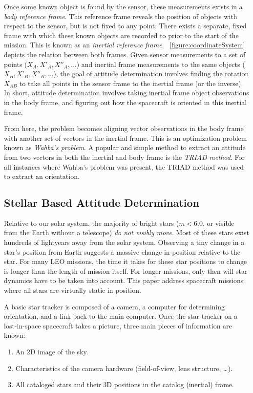 Once some known object is found by the sensor, these measurements exists in a \textit{body reference frame}.
This reference frame reveals the position of objects with respect to the sensor, but is not fixed to any point.
There exists a separate, fixed frame with which these known objects are recorded to prior to the start of the mission.
This is known as an \textit{inertial reference frame}.
~\autoref{figure:coordinateSystem} depicts the relation between both frames.
Given sensor measurements to a set of points ($X_A, X'_A, X''_A, \ldots$) and inertial frame measurements to the same
objects ($X_B, X'_B, X''_B, \ldots$), the goal of attitude determination involves finding the rotation $X_{AB}$ to
take all points in the sensor frame to the inertial frame (or the inverse).
In short, attitude determination involves taking inertial frame object observations in the body frame, and figuring out
how the spacecraft is oriented in this inertial frame.

From here, the problem becomes aligning vector observations in the body frame with another set of vectors in the
inertial frame.
This is an optimization problem known as \textit{Wahba's problem}.
A popular and simple method to extract an attitude from two vectors in both the inertial and body frame is the
\textit{TRIAD method}.
For all instances where Wahba's problem was present, the TRIAD method was used to extract an orientation.

\subsection{Stellar Based Attitude Determination}\label{subsec:stellarBasedAttitudeDetermination}
Relative to our solar system, the majority of bright stars ($m < 6.0$, or visible from the Earth without a telescope)
\textit{do not visibly move}.
Most of these stars exist hundreds of lightyears away from the solar system.
Observing a tiny change in a star's position from Earth suggests a massive change in position relative to the star.
For many LEO missions, the time it takes for these star positions to change is longer than the length of mission itself.
For longer missions, only then will star dynamics have to be taken into account.
This paper address spacecraft missions where all stars are virtually static in position.

A basic star tracker is composed of a camera, a computer for determining orientation, and a link back to the main
computer.
Once the star tracker on a lost-in-space spacecraft takes a picture, three main pieces of information are known:
\begin{enumerate}
    \item An 2D image of the sky.
    \item Characteristics of the camera hardware (field-of-view, lens structure, \ldots).
    \item All cataloged stars and their 3D positions in the catalog (inertial) frame.
\end{enumerate}

